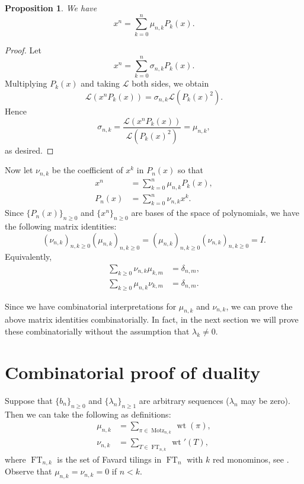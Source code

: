 \documentclass[oneside]{book}
\numberwithin{equation}{section}
\newtheorem{prop}[thm]{Proposition}
\theoremstyle{definition}
\newcommand\Motz{\operatorname{Motz}}
\newcommand\LL{\mathcal{L}}
\newcommand\FT{\operatorname{FT}}
\newcommand\wt{\operatorname{wt}}
\begin{document}
\begin{prop}\label{pro:1}
  We have
 \[
     x^n = \sum_{k=0}^{n} \mu_{n,k} P_k(x).
 \] 
\end{prop}

\begin{proof}
  Let
  \[
      x^n = \sum_{k=0}^{n} \sigma_{n,k} P_k(x).
  \]
  Multiplying \( P_k(x) \) and taking \( \LL \) both sides, we obtain
\[
  \LL(x^nP_k(x)) = \sigma_{n,k} \LL(P_k(x)^2).
\]
Hence
\[
  \sigma_{n,k} =  \frac{\LL(x^nP_k(x))}{\LL(P_k(x)^2)}
  = \mu_{n,k},
\]
as desired.
\end{proof}

Now let \( \nu_{n,k} \) be the coefficient of \( x^k \) in
\( P_n(x) \) so that
\begin{align*}
  x^n &= \sum_{k=0}^{n} \mu_{n,k} P_k(x),\\
  P_n(x) &= \sum_{k=0}^{n} \nu_{n,k} x^k.
\end{align*}
Since \( \{ P_n(x) \}_{n\ge 0} \) and \( \{x^n\}_{n\ge0} \) are bases
of the space of polynomials, we have the following matrix identities:
\[
  \left( \nu_{n,k} \right)_{n,k\ge0} \left( \mu_{n,k} \right)_{n,k\ge0} = 
  \left( \mu_{n,k} \right)_{n,k\ge0} \left( \nu_{n,k} \right)_{n,k\ge0} = I.
\]
Equivalently,
\begin{align}
  \label{eq:27}
\sum_{k\ge0} \nu_{n,k}\mu_{k,m} &= \delta_{n,m},\\
  \label{eq:28}
\sum_{k\ge0} \mu_{n,k}\nu_{k,m} &= \delta_{n,m}.
\end{align}


Since we have combinatorial interpretations for \( \mu_{n,k} \) and
\( \nu_{n,k} \), we can prove the above matrix identities
combinatorially. In fact, in the next section we will prove these
combinatorially without the assumption that \( \lambda_k\ne 0 \).

\section{Combinatorial proof of duality}

Suppose that \( \{b_n\}_{n\ge0} \) and \( \{\lambda_n\}_{n\ge1} \) are
arbitrary sequences (\( \lambda_n \) may be zero). Then we can take
the following as definitions:
\begin{align*}
  \mu_{n,k} &= \sum_{\pi\in \Motz_{n,k}} \wt(\pi),\\
  \nu_{n,k} &= \sum_{T\in \FT_{n,k}} \wt'(T),
\end{align*}
where \( \FT_{n,k} \) is the set of Favard tilings in \( \FT_n \) with
\( k \) red monominos, see . Observe that
\( \mu_{n,k} = \nu_{n,k}=0 \) if 
\( n<k \).
\end{document}
